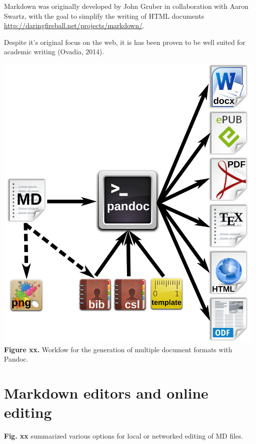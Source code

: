\documentclass[10pt,fleqn]{wlpeerj}
\begin{document}
Markdown
was
originally
developed
by
John
Gruber
in
collaboration
with
Aaron
Swartz,
with
the
goal
to
simplify
the
writing
of
HTML
documents
\url{http://daringfireball.net/projects/markdown/}.

Despite
it's
original
focus
on
the
web,
it is
has
been
proven
to be
well
suited
for
academic
writing
(Ovadia,
2014).

\includegraphics{fig-pandoc-workflow.png}
\textbf{Figure
xx.}
Workfow
for
the
generation
of
multiple
document
formats
with
Pandoc.

\section{Markdown
editors
and
online
editing}\label{markdown-editors-and-online-editing}

\textbf{Fig.
xx}
summarized
various
options
for
local
or
networked
editing
of MD
files.
\end{document}
